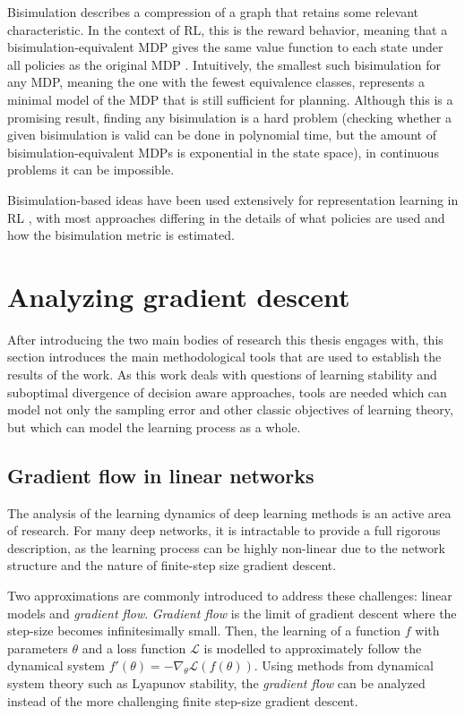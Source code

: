 Bisimulation describes a compression of a graph that retains some relevant characteristic.
In the context of RL, this is the reward behavior, meaning that a bisimulation-equivalent MDP gives the same value function to each state under all policies as the original MDP \parencite{ferns2011bisimulation}.
Intuitively, the smallest such bisimulation for any MDP, meaning the one with the fewest equivalence classes, represents a minimal model of the MDP that is still sufficient for planning.
Although this is a promising result, finding any bisimulation is a hard problem (checking whether a given bisimulation is valid can be done in polynomial time, but the amount of bisimulation-equivalent MDPs is exponential in the state space), in continuous problems it can be impossible.

Bisimulation-based ideas have been used extensively for representation learning in RL \parencite{zhang2021learning,kemertas2021towards,kastner2021mico}, with most approaches differing in the details of what policies are used and how the bisimulation metric is estimated.

\section{Analyzing gradient descent}


After introducing the two main bodies of research this thesis engages with, this section introduces the main methodological tools that are used to establish the results of the work.
As this work deals with questions of learning stability and suboptimal divergence of decision aware approaches, tools are needed which can model not only the sampling error and other classic objectives of learning theory, but which can model the learning process as a whole.

\subsection{Gradient flow in linear networks}

The analysis of the learning dynamics of deep learning methods is an active area of research.
For many deep networks, it is intractable to provide a full rigorous description, as the learning process can be highly non-linear due to the network structure and the nature of finite-step size gradient descent.

Two approximations are commonly introduced to address these challenges: linear models and \emph{gradient flow}.
\emph{Gradient flow} is the limit of gradient descent where the step-size becomes infinitesimally small.
Then, the learning of a function $f$ with parameters $\theta$ and a loss function $\mathcal{L}$ is modelled to approximately follow the dynamical system $f'(\theta) = -\nabla_\theta \mathcal{L}\left(f(\theta)\right)$.
Using methods from dynamical system theory such as Lyapunov stability, the \emph{gradient flow} can be analyzed instead of the more challenging finite step-size gradient descent.

